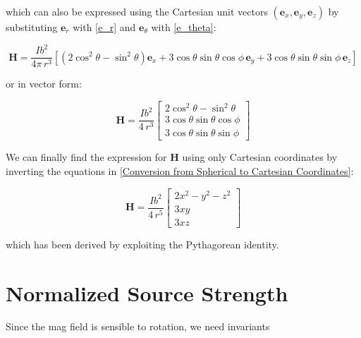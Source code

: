 which can also be expressed using the Cartesian unit 
vectors \((\mathbf{e}_x, \mathbf{e}_y, \mathbf{e}_z)\) 
by substituting \(\mathbf{e}_r\) with \ref{e_r} and 
\(\mathbf{e}_\theta\) with \ref{e_theta}:

\[
    \mathbf{H} = \frac{I b^2}{4 \pi \, r^3} \left[ 
    (2\cos^2\theta - \sin^2\theta) \mathbf{e}_x 
    + 3\cos\theta \sin\theta \cos\phi \, \mathbf{e}_y 
    + 3\cos\theta \sin\theta \sin\phi \, \mathbf{e}_z \right]
\]

or in vector form:

\[
    \mathbf{H} = \frac{I b^2}{4 \, r^3} 
    \begin{bmatrix}
        2\cos^2\theta - \sin^2\theta \\
        3\cos\theta \sin\theta \cos\phi \\
        3\cos\theta \sin\theta \sin\phi
    \end{bmatrix}
\]

We can finally find the expression for $\mathbf{H}$ 
using only Cartesian coordinates by inverting the 
equations in \ref{Conversion from Spherical to 
Cartesian Coordinates}:

\[
    \mathbf{H} = \frac{I b^2}{4 \, r^5} 
    \begin{bmatrix}
        2x^2 - y^2 - z^2 \\
        3xy \\
        3xz
    \end{bmatrix}
\]

which has been derived by exploiting the Pythagorean 
identity.

\section{Normalized Source Strength}
Since the mag field is sensible to rotation, we need invariants
